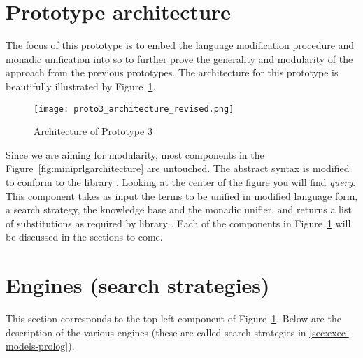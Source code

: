 \documentclass[thesis-solanki.tex]{files}
\begin{document}
\section{Prototype architecture}

The focus of this prototype is to embed the language modification procedure and monadic unification into \cite{website:mini-prolog-hugs98} so to further 
prove the generality and modularity of the approach from the previous prototypes. 
The architecture for this prototype is beautifully illustrated by Figure~\ref{fig:architecture-proto-3}. 

\begin{figure}[H]
  \texttt{[image: proto3\_architecture\_revised.png]}
\vspace*{-1cm}
  \caption{Architecture of Prototype 3}
  \label{fig:architecture-proto-3}
\end{figure}

Since we are aiming for modularity, most components in the Figure~\ref{fig:miniprlgarchitecture} are untouched. The abstract syntax is modified to conform to
the  library \cite{unification-fd-lib}.
Looking at the center of the figure you will find \textit{query}. This component takes as input the terms to be unified in modified language form, a 
search strategy, the knowledge base and the monadic unifier, and returns a list of substitutions as required by  library
\cite{website:mini-prolog-hugs98}. Each of the components in Figure~\ref{fig:architecture-proto-3} will be
discussed in the sections to come.   


\section{Engines (search strategies)}
This section corresponds to the top left component of Figure~\ref{fig:architecture-proto-3}. Below are the description of the various engines (these are
called search strategies in \ref{sec:exec-models-prolog}).
\end{document}
